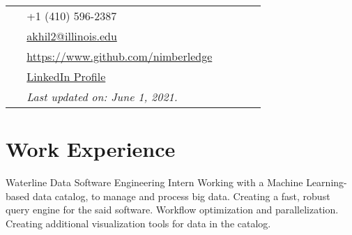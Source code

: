 \documentclass[10pt, oneside, openany]{article} %
\begin{document}
\begin{paracol}{2}
\parbox[top][0.09\textheight][c]{\linewidth}{ %
	\vspace{-0.05\textheight} %
	\colorbox{shade}{ %
		\begin{supertabular}{p{0.05\linewidth}|p{0.775\linewidth}} %
			\raisebox{-1pt}{\faPhone} & +1 (410) 596-2387 \\ %
			\raisebox{0pt}{\small\faEnvelope} & \href{mailto:akhil2@illinois.edu}{akhil2@illinois.edu} \\ %
			\raisebox{-1pt}{\faGithub} & \href{https://www.github.com/nimberledge}{https://www.github.com/nimberledge} \\ %
			\raisebox{-1pt}{\faLinkedinSquare} & \href{https://www.linkedin.com/in/akhil-krishna-m-a308a8131/}{LinkedIn Profile} \\ %
			\raisebox{-1pt}{} & \textit{Last updated on: June 1, 2021.}\\
		\end{supertabular}
	}
}


\section{Work Experience}




{} %
{Waterline Data} %
{Software Engineering Intern} %
{Working with a Machine Learning-based data catalog, to manage and process big data. Creating a fast, robust query engine for the said software. Workflow optimization and parallelization. Creating additional visualization tools for data in the catalog.}%


\end{paracol}
\end{document}

